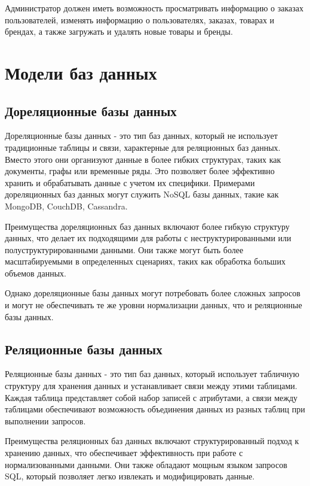 \documentclass{bmstu}
\begin{document}
Администратор должен иметь возможность просматривать информацию о заказах пользователей, изменять информацию о пользователях, заказах, товарах и брендах, а также загружать и удалять новые товары и бренды.

\section{Модели баз данных}

\subsection{Дореляционные базы данных}

Дореляционные базы данных - это тип баз данных, который не использует традиционные таблицы и связи, характерные для реляционных баз данных. Вместо этого они организуют данные в более гибких структурах, таких как документы, графы или временные ряды. Это позволяет более эффективно хранить и обрабатывать данные с учетом их специфики. Примерами дореляционных баз данных могут служить NoSQL базы данных, такие как MongoDB, CouchDB, Cassandra.

Преимущества дореляционных баз данных включают более гибкую структуру данных, что делает их подходящими для работы с неструктурированными или полуструктурированными данными. Они также могут быть более масштабируемыми в определенных сценариях, таких как обработка больших объемов данных.

Однако дореляционные базы данных могут потребовать более сложных запросов и могут не обеспечивать те же уровни нормализации данных, что и реляционные базы данных.

\subsection{Реляционные базы данных}

Реляционные базы данных - это тип баз данных, который использует табличную структуру для хранения данных и устанавливает связи между этими таблицами. Каждая таблица представляет собой набор записей с атрибутами, а связи между таблицами обеспечивают возможность объединения данных из разных таблиц при выполнении запросов.

Преимущества реляционных баз данных включают структурированный подход к хранению данных, что обеспечивает эффективность при работе с нормализованными данными. Они также обладают мощным языком запросов SQL, который позволяет легко извлекать и модифицировать данные.
\end{document}
